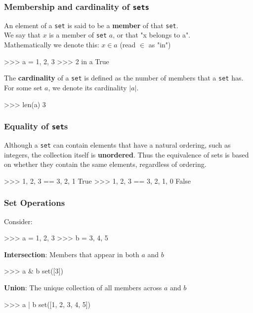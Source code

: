 \documentclass{beamer}
\begin{document}
\begin{frame}[fragile]
\frametitle{Membership and cardinality of \texttt{sets}}
An element of a \texttt{set} is said to be a \textbf{member} of that \texttt{set}.\\
    We say that $x$ is a member of \texttt{set} $a$, or that
    "x belongs to a".\\
    Mathematically we denote this: $x \in a$ (read $\in$ as "in")\\
\begin{code}
>>> a = {1, 2, 3}
>>> 2 in a
True
\end{code}

\bigskip
    The \textbf{cardinality} of a \texttt{set} is defined as the number of members that a \texttt{set} has.
    For some set $a$, we denote its cardinality $|a|$.\\
\begin{code}
>>> len(a)
3
\end{code}
\end{frame}

\begin{frame}[fragile]
\frametitle{Equality of \texttt{set}s}
Although a \texttt{set} can contain elements that have a natural ordering, such as
integers, the collection itself is \textbf{unordered}. Thus the equivalence of sets
is based on whether they contain the same elements, regardless of ordering.
\begin{code}
>>> {1, 2, 3} == {3, 2, 1}
True
>>> {1, 2, 3} == {3, 2, 1, 0}
False
\end{code}
\end{frame}


\begin{frame}[fragile]
\frametitle{Set Operations}
Consider:
\begin{code}
>>> a = {1, 2, 3}
>>> b = {3, 4, 5}
\end{code}

\vskip 0.4cm
\textbf{Intersection}: Members that appear in both $a$ and $b$
\begin{code}
>>> a & b
set([3])
\end{code}

\vskip 0.4cm
\textbf{Union}: The unique collection of all members across $a$ and $b$
\begin{code}
>>> a | b
set([1, 2, 3, 4, 5])
\end{code}
\end{frame}
\end{document}

